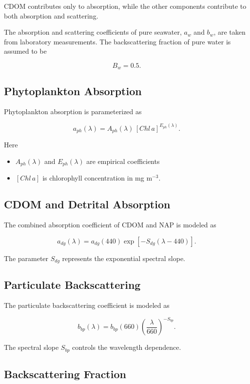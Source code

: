 \documentclass[
  11pt,
  letterpaper,
  DIV=11,
  numbers=noendperiod]{scrreprt}
\providecommand{\tightlist}{%
  \setlength{\itemsep}{0pt}\setlength{\parskip}{0pt}}
\begin{document}
CDOM contributes only to absorption, while the other components
contribute to both absorption and scattering.

The absorption and scattering coefficients of pure seawater, \(a_w\) and
\(b_w\), are taken from laboratory measurements. The backscattering
fraction of pure water is assumed to be

\[
B_w = 0.5.
\]

\subsection{Phytoplankton Absorption}\label{phytoplankton-absorption-1}

Phytoplankton absorption is parameterized as

\[
a_{ph}(\lambda) = A_{ph}(\lambda)\,[Chl\,a]^{E_{ph}(\lambda)}.
\]

Here

\begin{itemize}
\tightlist
\item
  \(A_{ph}(\lambda)\) and \(E_{ph}(\lambda)\) are empirical coefficients
\item
  \([Chl\,a]\) is chlorophyll concentration in mg m\(^{-3}\).
\end{itemize}

\subsection{CDOM and Detrital
Absorption}\label{cdom-and-detrital-absorption}

The combined absorption coefficient of CDOM and NAP is modeled as

\[
a_{dg}(\lambda) =
a_{dg}(440)\exp\!\left[-S_{dg}(\lambda-440)\right].
\]

The parameter \(S_{dg}\) represents the exponential spectral slope.

\subsection{Particulate
Backscattering}\label{particulate-backscattering-1}

The particulate backscattering coefficient is modeled as

\[
b_{bp}(\lambda) =
b_{bp}(660)\left(\frac{\lambda}{660}\right)^{-S_{bp}}.
\]

The spectral slope \(S_{bp}\) controls the wavelength dependence.

\subsection{Backscattering Fraction}\label{backscattering-fraction-1}
\end{document}

